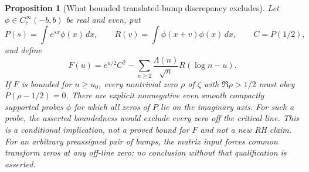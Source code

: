 \documentclass[11pt]{article}
\newtheorem{proposition}[theorem]{Proposition}
\theoremstyle{remark}
\begin{document}
\begin{proposition}[What bounded translated-bump discrepancy excludes]
\label{prop:ns43-bump-strength}
Let $\phi\in C_c^\infty(-b,b)$ be real and even, put
\[
 P(s)=\int e^{sx}\phi(x)\,dx,\qquad
 R(v)=\int\phi(x+v)\phi(x)\,dx,\qquad C=P(1/2),
\]
and define
\[
 F(u)=e^{u/2}C^2-
        \sum_{n\ge2}\frac{\Lambda(n)}{\sqrt n}R(\log n-u).
\]
If $F$ is bounded for $u\ge u_0$, every nontrivial zero $\rho$ of
$\zeta$ with $\Re\rho>1/2$ must obey $P(\rho-1/2)=0$.
There are explicit nonnegative even smooth compactly supported probes
$\phi$ for which all zeros of $P$ lie on the imaginary axis. For
such a probe, the asserted boundedness would exclude every zero off
the critical line. This is a conditional implication, not a proved
bound for $F$ and not a new RH claim. For an arbitrary preassigned
pair of bumps, the matrix input forces common transform zeros at
any off-line zero; no conclusion without that qualification is asserted.
\end{proposition}
\end{document}
